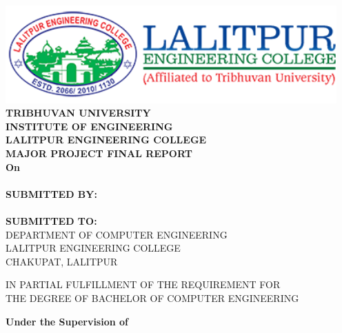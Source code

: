 \begin{center}
    \setlength{\parskip}{0pt}
    \linespread{1.6}
    \thispagestyle{empty}
    \includegraphics[width= 5in ]{img/leclogo.png} \\
    \vspace{0.1 in}
    {\fontsize{12 pt}{12} \selectfont\textbf{TRIBHUVAN UNIVERSITY} \\
        \textbf{INSTITUTE OF ENGINEERING} \\
        \textbf{LALITPUR ENGINEERING COLLEGE}} \\

    \vspace{0.4 in}
    \textbf{MAJOR PROJECT FINAL REPORT}\\
    {\fontsize{12 pt}{12} \selectfont\textbf{On}\\}
    {\fontsize{12 pt}{12} \selectfont \textbf{\thetitle}}\\
    \vspace{0.4in}
    \textbf{ SUBMITTED BY:}  \\
    {\theauthor} \\
    \vspace{0.3 in}
    \textbf{ SUBMITTED TO:}  \\
    \MakeUppercase{Department of Computer Engineering \\
    Lalitpur Engineering College \\
    Chakupat, Lalitpur \\}

    \vspace{0.3in}
    IN PARTIAL FULFILLMENT OF THE REQUIREMENT FOR \\ THE DEGREE OF BACHELOR OF COMPUTER ENGINEERING

    \vspace{0.2in}
    \textbf{Under the Supervision of} \\
    \thesupervisor\\
    \vspace{0.2in}
    \thedate

\end{center}
